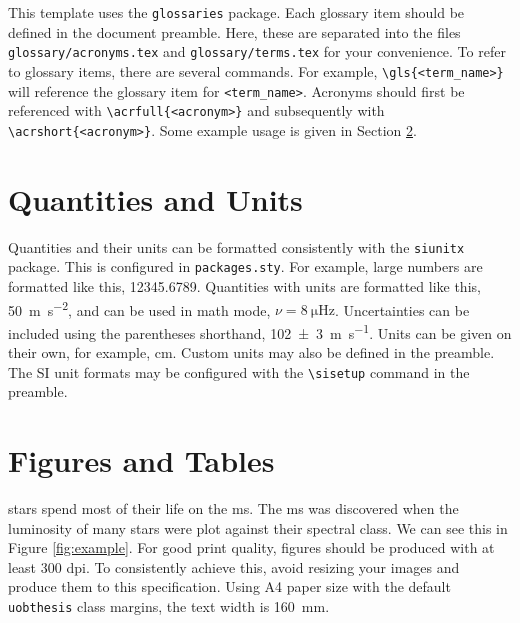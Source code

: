 This template uses the \texttt{glossaries} package. Each glossary item should be defined in the document preamble. Here, these are separated into the files \texttt{glossary/acronyms.tex} and \texttt{glossary/terms.tex} for your convenience. To refer to glossary items, there are several commands. For example, \texttt{\textbackslash gls\{<term\_name>\}} will reference the glossary item for \texttt{<term\_name>}. Acronyms should first be referenced with \texttt{\textbackslash acrfull\{<acronym>\}} and subsequently with \texttt{\textbackslash acrshort\{<acronym>\}}. Some example usage is given in Section \ref{sec:figandtab}.

\section{Quantities and Units}

Quantities and their units can be formatted consistently with the \texttt{siunitx} package. This is configured in \texttt{packages.sty}. For example, large numbers are formatted like this, \num{12345.6789}. Quantities with units are formatted like this, \SI{50}{\meter\per\second\squared}, and can be used in math mode, $\nu = \SI{8}{\micro\hertz}$. Uncertainties can be included using the parentheses shorthand, \SI{102(3)}{\meter\per\second}. Units can be given on their own, for example, \si{\centi\meter}. Custom units may also be defined in the preamble. The SI unit formats may be configured with the \texttt{\textbackslash sisetup} command in the preamble.

\section{Figures and Tables}\label{sec:figandtab}

\Glspl{star} spend most of their life on the \acrfull{ms}. The \acrshort{ms} was discovered when the \gls{luminosity} of many stars were plot against their spectral class. We can see this in Figure \ref{fig:example}. For good print quality, figures should be produced with at least 300 \acrfull{dpi}. To consistently achieve this, avoid resizing your images and produce them to this specification. Using A4 paper size with the default \texttt{uobthesis} class margins, the text width is \SI{160}{\milli\meter}.

